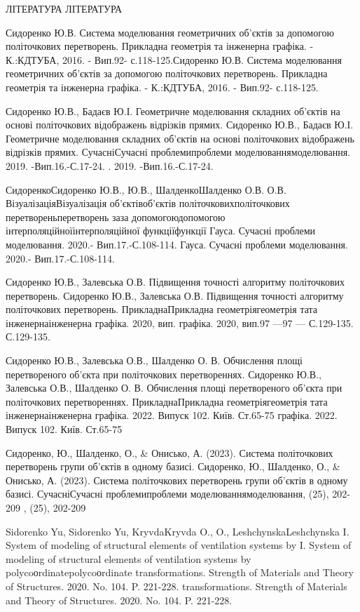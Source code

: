 \documentclass[12pt,a4paper]{article}
\begin{document}
\par
ЛІТЕРАТУРА ЛІТЕРАТУРА
\par
Сидоренко Ю.В. Система моделювання геометричних об’єктів за допомогою політочкових перетворень. Прикладна геометрія та інженерна графіка. - К.:КДТУБА, 2016. - Вип.92- с.118-125.Сидоренко Ю.В. Система моделювання геометричних об’єктів за допомогою політочкових перетворень. Прикладна геометрія та інженерна графіка. - К.:КДТУБА, 2016. - Вип.92- с.118-125.
\par
Сидоренко Ю.В., Бадаєв Ю.І. Геометричне моделювання складних об’єктів на основі політочкових відображень відрізків прямих. Сидоренко Ю.В., Бадаєв Ю.І. Геометричне моделювання складних об’єктів на основі політочкових відображень відрізків прямих. СучасніСучасні  проблемипроблеми  моделюваннямоделювання. 2019. -Вип.16.-С.17-24.  . 2019. -Вип.16.-С.17-24.
\par
СидоренкоСидоренко Ю.В.,  Ю.В., ШалденкоШалденко О.В.  О.В. ВізуалізаціяВізуалізація  об’єктівоб’єктів  політочковихполіточкових  перетвореньперетворень  заза  допомогоюдопомогою  інтерполяційноїінтерполяційної  функціїфункції Гауса. Сучасні проблеми моделювання. 2020.- Вип.17.-С.108-114.  Гауса. Сучасні проблеми моделювання. 2020.- Вип.17.-С.108-114.
\par
Сидоренко Ю.В., Залевська О.В. Підвищення точності алгоритму політочкових перетворень.  Сидоренко Ю.В., Залевська О.В. Підвищення точності алгоритму політочкових перетворень.  ПрикладнаПрикладна  геометріягеометрія  тата  інженернаінженерна графіка.  2020, вип. графіка.  2020, вип.97  —97  —  С.129-135.      С.129-135.
\par
Сидоренко Ю.В., Залевська О.В., Шалденко О. В. Обчислення площі перетвореного об’єкта при політочкових перетвореннях. Сидоренко Ю.В., Залевська О.В., Шалденко О. В. Обчислення площі перетвореного об’єкта при політочкових перетвореннях. ПрикладнаПрикладна  геометріягеометрія  тата  інженернаінженерна графіка. 2022. Випуск 102. Київ. Ст.65-75  графіка. 2022. Випуск 102. Київ. Ст.65-75
\par
Сидоренко, Ю., Шалденко, О., \& Онисько, А. (2023). Система політочкових перетворень групи об’єктів в одному базисі. Сидоренко, Ю., Шалденко, О., \& Онисько, А. (2023). Система політочкових перетворень групи об’єктів в одному базисі. СучасніСучасні  проблемипроблеми  моделюваннямоделювання, (25), 202-209  , (25), 202-209
\par
Sidorenko Yu, Sidorenko Yu, KryvdaKryvda O.,  O., LeshchynskaLeshchynska I. System of modeling of structural elements of ventilation systems by  I. System of modeling of structural elements of ventilation systems by polycoоrdinatepolycoоrdinate transformations. Strength of Materials and Theory of Structures. 2020. No. 104. P. 221-228.  transformations. Strength of Materials and Theory of Structures. 2020. No. 104. P. 221-228.
\end{document}
